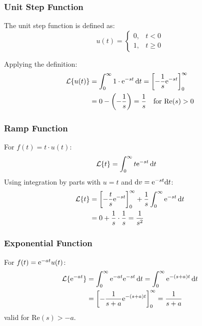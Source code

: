 \subsubsection{Unit Step Function}

The unit step function is defined as:
\begin{equation}
u(t) = \begin{cases} 0, & t < 0 \\ 1, & t \geq 0 \end{cases}
\end{equation}

Applying the definition:
\begin{align}
\mathcal{L}\{u(t)\} &= \int_0^{\infty} 1 \cdot \mathrm{e}^{-st}\,\mathrm{d} t = \left[-\frac{1}{s}\mathrm{e}^{-st}\right]_0^{\infty} \nonumber \\
&= 0 - \left(-\frac{1}{s}\right) = \frac{1}{s} \quad \text{for } \mathrm{Re}(s) > 0
\label{eq:step_transform}
\end{align}

\subsubsection{Ramp Function}

For $f(t) = t \cdot u(t)$:
\begin{align}
\mathcal{L}\{t\} &= \int_0^{\infty} t\mathrm{e}^{-st}\,\mathrm{d} t
\end{align}
Using integration by parts with $u = t$ and $\mathrm{d} v = \mathrm{e}^{-st}\mathrm{d} t$:
\begin{align}
\mathcal{L}\{t\} &= \left[-\frac{t}{s}\mathrm{e}^{-st}\right]_0^{\infty} + \frac{1}{s}\int_0^{\infty}\mathrm{e}^{-st}\,\mathrm{d} t \nonumber \\
&= 0 + \frac{1}{s}\cdot\frac{1}{s} = \frac{1}{s^2}
\label{eq:ramp_transform}
\end{align}

\subsubsection{Exponential Function}

For $f(t) = \mathrm{e}^{-at}u(t)$:
\begin{align}
\mathcal{L}\{\mathrm{e}^{-at}\} &= \int_0^{\infty} \mathrm{e}^{-at}\mathrm{e}^{-st}\,\mathrm{d} t = \int_0^{\infty} \mathrm{e}^{-(s+a)t}\,\mathrm{d} t \nonumber \\
&= \left[-\frac{1}{s+a}\mathrm{e}^{-(s+a)t}\right]_0^{\infty} = \frac{1}{s+a}
\label{eq:exp_transform}
\end{align}
valid for $\mathrm{Re}(s) > -a$.

